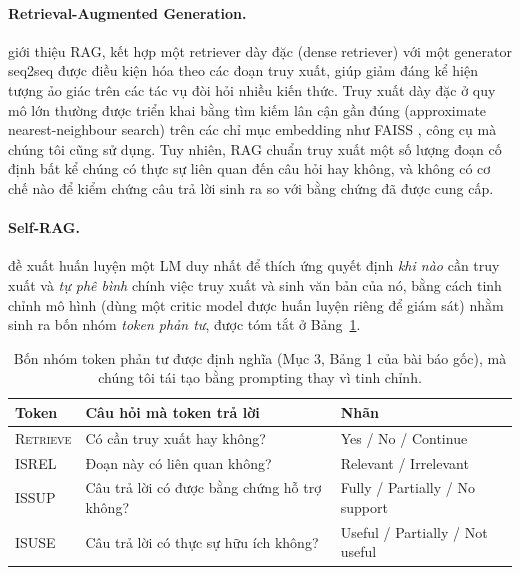 \documentclass[11pt]{article}
\begin{document}
\paragraph{Retrieval-Augmented Generation.} \citet{lewis2020retrieval} giới thiệu RAG, kết hợp một retriever dày đặc (dense retriever) với một generator seq2seq được điều kiện hóa theo các đoạn truy xuất, giúp giảm đáng kể hiện tượng ảo giác trên các tác vụ đòi hỏi nhiều kiến thức. Truy xuất dày đặc ở quy mô lớn thường được triển khai bằng tìm kiếm lân cận gần đúng (approximate nearest-neighbour search) trên các chỉ mục embedding như FAISS \citep{johnson2019billion}, công cụ mà chúng tôi cũng sử dụng. Tuy nhiên, RAG chuẩn truy xuất một số lượng đoạn cố định bất kể chúng có thực sự liên quan đến câu hỏi hay không, và không có cơ chế nào để kiểm chứng câu trả lời sinh ra so với bằng chứng đã được cung cấp.

\paragraph{Self-RAG.} \citet{asai2024selfrag} đề xuất huấn luyện một LM duy nhất để thích ứng quyết định \emph{khi nào} cần truy xuất và \emph{tự phê bình} chính việc truy xuất và sinh văn bản của nó, bằng cách tinh chỉnh mô hình (dùng một critic model được huấn luyện riêng để giám sát) nhằm sinh ra bốn nhóm \emph{token phản tư}, được tóm tắt ở Bảng~\ref{tab:reflection-tokens}.

\begin{table}[t]
\centering
\small
\begin{tabular}{@{}p{1.4cm}p{2.6cm}p{2.0cm}@{}}
\toprule
\textbf{Token} & \textbf{Câu hỏi mà token trả lời} & \textbf{Nhãn} \\
\midrule
\textsc{Retrieve} & Có cần truy xuất hay không? & Yes / No / Continue \\
\textsc{ISREL} & Đoạn này có liên quan không? & Relevant / Irrelevant \\
\textsc{ISSUP} & Câu trả lời có được bằng chứng hỗ trợ không? & Fully / Partially / No support \\
\textsc{ISUSE} & Câu trả lời có thực sự hữu ích không? & Useful / Partially / Not useful \\
\bottomrule
\end{tabular}
\caption{Bốn nhóm token phản tư được \citet{asai2024selfrag} định nghĩa (Mục 3, Bảng 1 của bài báo gốc), mà chúng tôi tái tạo bằng prompting thay vì tinh chỉnh.}
\label{tab:reflection-tokens}
\end{table}
\end{document}
